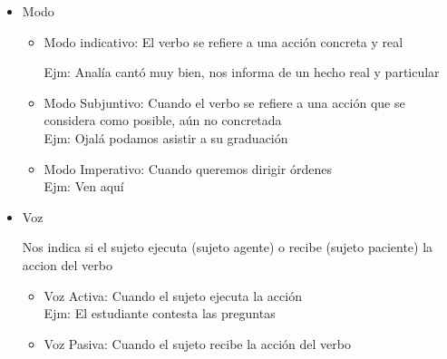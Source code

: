 \documentclass[•]{article}
\begin{document}
\begin{flushleft}
\begin{itemize}
\begin{itemize}
		\item Tiempo Presente: La acci\'on se est\'a realizando actualmente \\ Juan corre
		\item Tiempo Futuro: Lo expresado por el verbo a\'un no ocurre, sino que ocurrir\'a posteriormente \\ Julia bailar\'a en el teatro
	\end{itemize}
	\item Modo
	\begin{itemize}
		\item Modo indicativo: El verbo se refiere a una acci\'on concreta y real
		
		Ejm: Anal\'ia cant\'o muy bien, nos informa de un hecho real y particular
		
		\item Modo Subjuntivo: Cuando el verbo se refiere a una acci\'on que se considera como posible, a\'un no concretada \\
		Ejm: Ojal\'a podamos asistir a su graduaci\'on
		
		\item Modo Imperativo: Cuando queremos dirigir \'ordenes \\ Ejm: Ven aqu\'i		
		
		
	\end{itemize}		
	
	
	\item Voz
	
	Nos indica si el sujeto ejecuta (sujeto agente) o recibe (sujeto paciente) la accion del verbo
	\begin{itemize}
		\item Voz Activa: Cuando el sujeto ejecuta la acci\'on \\ Ejm: El estudiante contesta las preguntas
		\item Voz Pasiva: Cuando el sujeto recibe la acci\'on del verbo
	\end{itemize}		
	
	
	\end{itemize}
	
	
\end{flushleft}
\end{document}
